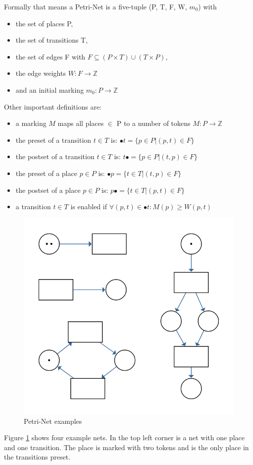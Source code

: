 Formally that means a Petri-Net is a five-tuple (P, T, F, W, $m_0$) with
\begin{itemize}
  \setlength\itemsep{-0.3em}
  \item the set of places P,
  \item the set of transitions T,
  \item the set of edges F with $F \subseteq (P \times T) \cup (T \times P)$,
  \item the edge weights $W: F \rightarrow \mathbb{Z} $
  \item and an initial marking $m_0: P \rightarrow \mathbb{Z} $
\end{itemize}
Other important definitions are:
\begin{itemize}
  \setlength\itemsep{-0.3em}
  \item a marking $M$ maps all places $\in$ P to a number of tokens $M: P \rightarrow \mathbb{Z}$
  \item the preset of a transition $t \in T$ is: $\bullet t = \{p \in P | (p,t) \in F\}$
  \item the postset of a transition $t \in T$ is: $t\bullet = \{p \in P | (t,p) \in F\}$
  \item the preset of a place $p \in P$ is: $\bullet p = \{t \in T | (t,p) \in F\}$
  \item the postset of a place $p \in P$ is: $p\bullet = \{t \in T | (p,t) \in F\}$
  \item a transition $t \in T$ is enabled if $\forall (p,t) \in \bullet t: M(p) \geq W(p,t)$
\end{itemize}
\begin{figure}
  \centering
  \includegraphics[width=.5\textwidth]{../diagrams/netExamples.png}
  \caption{Petri-Net examples}
  \label{net_examples}
\end{figure}
Figure \ref{net_examples} shows four example nets.
In the top left corner is a net with one place and one transition.
The place is marked with two tokens and is the only place in the transitions preset.
